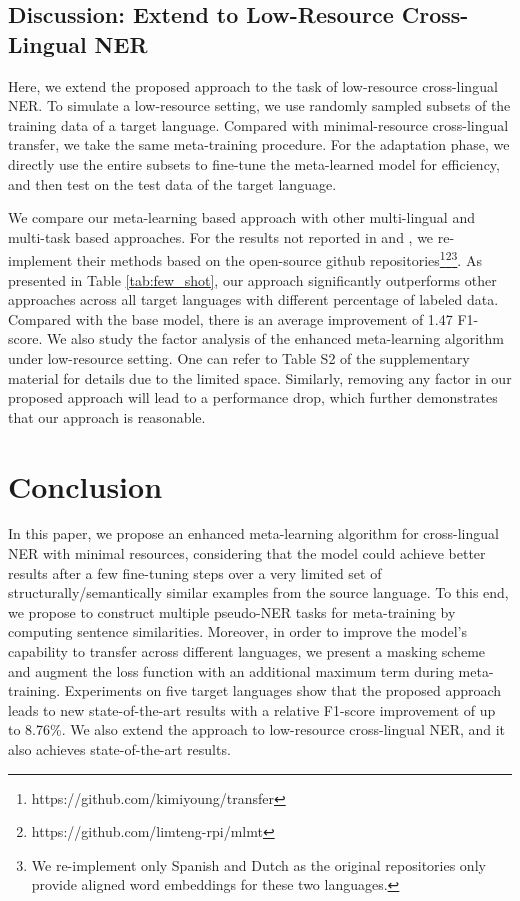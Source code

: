 \documentclass[letterpaper]{article} \usepackage{aaai20}  \usepackage{times}  \usepackage{helvet} \usepackage{courier}  \usepackage[hyphens]{url}  \usepackage{graphicx} \urlstyle{rm} \def\UrlFont{\rm}  \usepackage{graphicx}
\begin{document}
 \subsection{Discussion: Extend to Low-Resource Cross-Lingual NER}
Here, we extend the proposed approach to the task of low-resource cross-lingual NER.
To simulate a low-resource setting, we use randomly sampled subsets of the training data of a target language.
Compared with minimal-resource cross-lingual transfer, we take the same meta-training procedure.
For the adaptation phase, we directly use the entire subsets to fine-tune the meta-learned model for efficiency, and then test on the test data of the target language.

We compare our meta-learning based approach with other multi-lingual and multi-task based approaches.
For the results not reported in \cite{yang2017transer} and \cite{lin2018amulti}, we re-implement their methods based on the open-source github repositories\footnote{https://github.com/kimiyoung/transfer}\footnote{https://github.com/limteng-rpi/mlmt}\footnote{We re-implement only Spanish and Dutch as the original repositories only provide aligned word embeddings for these two languages.}.
As presented in Table \ref{tab:few_shot}, our approach significantly outperforms other approaches across all target languages with different percentage of labeled data. 
Compared with the base model, there is an average improvement of 1.47 F1-score. 
We also study the factor analysis of the enhanced meta-learning algorithm under low-resource setting. 
One can refer to Table S2 of the supplementary material for details due to the limited space. Similarly, removing any factor in our proposed approach will lead to a performance drop, which further demonstrates that our approach is reasonable. \section{Conclusion}
In this paper, we propose an enhanced meta-learning algorithm for cross-lingual NER with minimal resources, considering that the model could achieve better results after a few fine-tuning steps over a very limited set of structurally/semantically similar examples from the source language.
To this end, we propose to construct multiple pseudo-NER tasks for meta-training by computing sentence similarities.
Moreover, in order to improve the model’s capability to transfer across different languages, we present a masking scheme and augment the loss function with an additional maximum term during meta-training.
Experiments on five target languages show that the proposed approach leads to new state-of-the-art results with a relative F1-score improvement of up to 8.76\%. 
We also extend the approach to low-resource cross-lingual NER, and it also achieves state-of-the-art results. 
 


\end{document}
